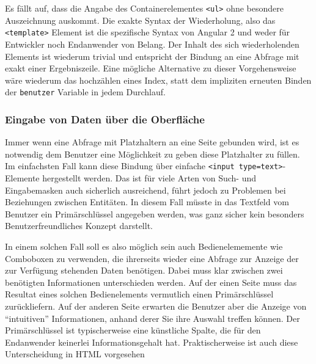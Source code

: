 Es fällt auf, dass die Angabe des Containerelementes \texttt{<ul>} ohne besondere Auszeichnung auskommt. Die exakte Syntax der Wiederholung, also das \texttt{<template>} Element ist die spezifische Syntax von Angular 2 und weder für Entwickler noch Endanwender von Belang. Der Inhalt des sich wiederholenden Elements ist wiederum trivial und entspricht der Bindung an eine Abfrage mit exakt einer Ergebniszeile. Eine mögliche Alternative zu dieser Vorgehensweise wäre wiederum das hochzählen eines Index, statt dem impliziten erneuten Binden der \texttt{benutzer} Variable in jedem Durchlauf.


\subsubsection{Eingabe von Daten über die Oberfläche}
\label{sec:design-ui-bind-input}

Immer wenn eine Abfrage mit Platzhaltern an eine Seite gebunden wird, ist es notwendig dem Benutzer eine Möglichkeit zu geben diese Platzhalter zu füllen. Im einfachsten Fall kann diese Bindung über einfache \texttt{<input type=text>}-Elemente hergestellt werden. Das ist für viele Arten von Such- und Eingabemasken auch sicherlich ausreichend, führt jedoch zu Problemen bei Beziehungen zwischen Entitäten. In diesem Fall müsste in das Textfeld vom Benutzer ein Primärschlüssel angegeben werden, was ganz sicher kein besonders Benutzerfreundliches Konzept darstellt.

In einem solchen Fall soll es also möglich sein auch Bedienelememente wie Comboboxen zu verwenden, die ihrerseits wieder eine Abfrage zur Anzeige der zur Verfügung stehenden Daten benötigen. Dabei muss klar zwischen zwei benötigten Informationen unterschieden werden. Auf der einen Seite muss das Resultat eines solchen Bedienelements vermutlich einen Primärschlüssel zurückliefern. Auf der anderen Seite erwarten die Benutzer aber die Anzeige von ``intuitiven'' Informationen, anhand derer Sie ihre Auswahl treffen können. Der Primärschlüssel ist typischerweise eine künstliche Spalte, die für den Endanwender keinerlei Informationsgehalt hat. Praktischerweise ist auch diese Unterscheidung in HTML vorgesehen

